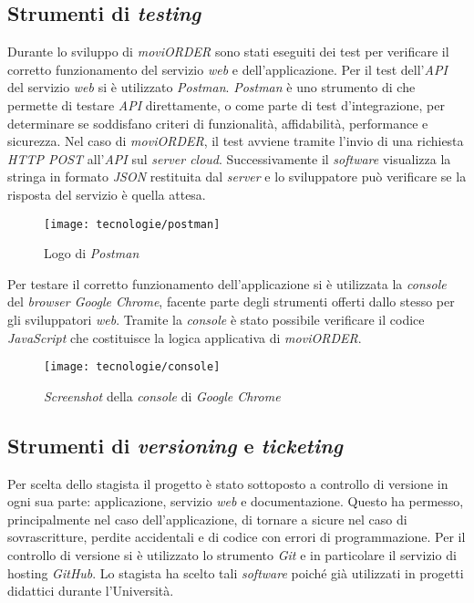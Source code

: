 \subsection{Strumenti di \textit{testing}}\label{postman}

Durante lo sviluppo di \textit{moviORDER} sono stati eseguiti dei test per verificare il corretto funzionamento del servizio \textit{web} e dell'applicazione. Per il test dell'\textit{API} del servizio \textit{web} si è utilizzato \textit{Postman}. \textit{Postman} è uno strumento di  che permette di testare \textit{API} direttamente, o come parte di test d'integrazione, per determinare se soddisfano criteri di funzionalità, affidabilità, performance e sicurezza. Nel caso di \textit{moviORDER}, il test avviene tramite l'invio di una richiesta \textit{HTTP POST} all'\textit{API} sul \textit{server cloud}. Successivamente il \textit{software} visualizza la stringa in formato \textit{JSON} restituita dal \textit{server} e lo sviluppatore può verificare se la risposta del servizio è quella attesa.

\begin{figure}[!h] 
    \centering 
    \texttt{[image: tecnologie/postman]} 
    \caption{Logo di \textit{Postman}}
\end{figure}

Per testare il corretto funzionamento dell'applicazione si è utilizzata la \textit{console} del \textit{browser Google Chrome}, facente parte degli strumenti offerti dallo stesso per gli sviluppatori \textit{web}. Tramite la \textit{console} è stato possibile verificare il codice \textit{JavaScript} che costituisce la logica applicativa di \textit{moviORDER}.

\begin{figure}[!h] 
    \centering 
    \texttt{[image: tecnologie/console]} 
    \caption{\textit{Screenshot} della \textit{console} di \textit{Google Chrome}}
\end{figure}

\newpage

\subsection{Strumenti di \textit{versioning} e \textit{ticketing}}

Per scelta dello stagista il progetto è stato sottoposto a controllo di versione in ogni sua parte: applicazione, servizio \textit{web} e documentazione. Questo ha permesso, principalmente nel caso dell'applicazione, di tornare a  sicure nel caso di sovrascritture, perdite accidentali e  di codice con errori di programmazione. Per il controllo di versione si è utilizzato lo strumento \textit{Git} e in particolare il servizio di hosting \textit{GitHub}. Lo stagista ha scelto tali \textit{software} poiché già utilizzati in progetti didattici durante l'Università.

